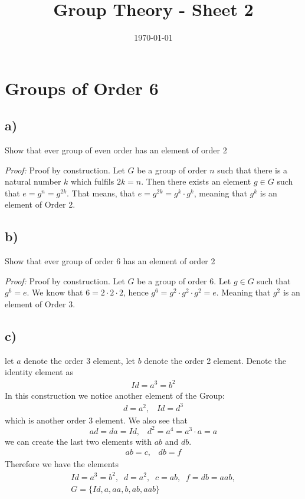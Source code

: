 \documentclass[]{scrartcl}
\title{Group Theory - Sheet 2}
\author{}
\date{\today}
\begin{document}
\maketitle
\newpage
\tableofcontents
\newpage

\section{Groups of Order 6}

\subsection{a)}
Show that ever group of even order has an element of order 2

\textit{Proof: } Proof by construction. Let $G$ be a group of order $n$ such that there is a natural number $k$ which fulfils $2k = n$. Then there exists an element $g\in G$ such that $e = g^n = g^{2k}$. That means, that $e = g^{2k} = g^k \cdot g^k$, meaning that $g^k$ is an element of Order 2.

\subsection{b)}
Show that ever group of order 6 has an element of order 2

\textit{Proof: } Proof by construction. Let $G$ be a group of order 6. Let $g\in G$ such that $g^6 = e$. We know that $6 = 2\cdot2\cdot2$, hence $g^6 = g^2\cdot g^2\cdot g^2 = e$. Meaning that $g^2$ is an element of Order 3.

\subsection{c)}
let $a$ denote the order 3 element, let $b$ denote the order 2 element. Denote the identity element as
\begin{gather*}
	Id = a^3 = b^2
\end{gather*}
In this construction we notice another element of the Group:
\begin{gather*}
	d = a^2,\;\;\; Id = d^3
\end{gather*}
which is another order 3 element. We also see that
\begin{equation*}
	ad = da = Id,\;\;\; d^2 = a^4 = a^3 \cdot a = a
\end{equation*}
we can create the last two elements with $ab$ and $db$.
\begin{gather*}
	ab = c,\;\;\; db = f
\end{gather*}
Therefore we have the elements
\begin{gather*}
	Id = a^3 = b^2,\;\; d = a^2,\;\; c = ab,\;\; f = db = aab,\\
	G = \{Id, a, aa, b , ab ,aab\}
\end{gather*}
\end{document}

